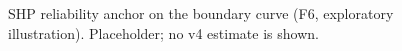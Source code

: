 \begin{figure}[t]
\centering{}
\caption{SHP reliability anchor on the boundary curve (F6, exploratory illustration). Placeholder; no v4 estimate is shown.}\label{fig:v4-F6}
\end{figure}
